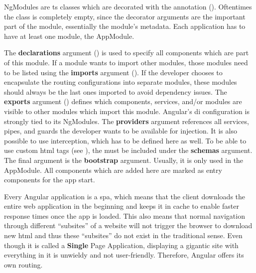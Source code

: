 
NgModules are \gls{ts} classes which are decorated with the  annotation (). Oftentimes the class is completely empty, since the decorator arguments are the important part of the module, essentially the module's metadata. Each application has to have at least one module, the AppModule.

The \textbf{declarations} argument () is used to specify all components which are part of this module. If a module wants to import other modules, those modules need to be listed using the \textbf{imports} argument (). If the developer chooses to encapsulate the routing configurations into separate modules, these modules should always be the last ones imported to avoid dependency issues. The \textbf{exports} argument () defines which components, services, and/or modules are visible to other modules which import this module. Angular's \gls{di} configuration is strongly tied to its NgModules. The \textbf{providers} argument references all services, pipes, and guards the developer wants to be available for injection. It is also possible to use interception, which has to be defined here as well. To be able to use custom \gls{html} tags (see ), the  must be included under the \textbf{schemas} argument. The final argument is the \textbf{bootstrap} argument. Usually, it is only used in the AppModule. All components which are added here are marked as entry components for the app start.


Every Angular application is a \gls{spa}, which means that the client downloads the entire web application in the beginning and keeps it in cache to enable faster response times once the app is loaded. This also means that normal navigation through different \enquote{subsites} of a website will not trigger the browser to download new \gls{html} and thus these \enquote{subsites} do not exist in the traditional sense. Even though it is called a \textbf{Single} Page Application, displaying a gigantic site with everything in it is unwieldy and not user-friendly. Therefore, Angular offers its own routing.


